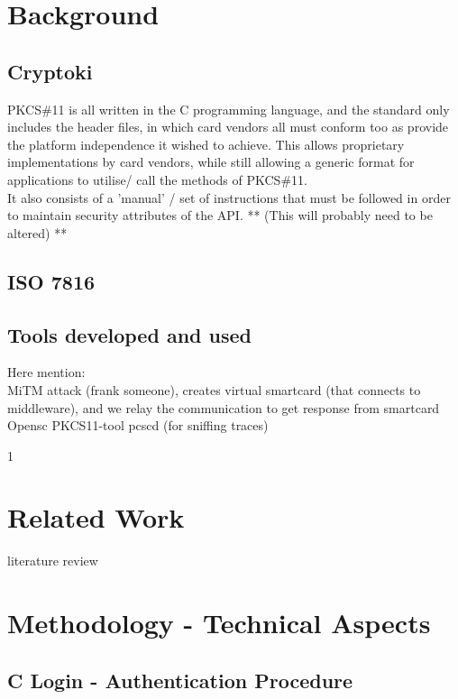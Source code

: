 \documentclass[a4paper]{report}
\begin{document}
\chapter{Background}

\section{Cryptoki}

\noindent PKCS\#11 is all written in the C programming language, and the standard only includes the header files, in which card vendors all must conform too as provide the platform independence it wished to achieve. This allows proprietary implementations by card vendors, while still allowing a generic format for applications to utilise/ call the methods of PKCS\#11.\\
It also consists of a 'manual' / set of instructions that must be followed in order to maintain security attributes of the API. ** (This will probably need to be altered) **\\


\section{ISO 7816}

\section{Tools developed and used}
Here mention:\\
MiTM attack (frank someone), creates virtual smartcard (that connects to middleware), and we relay the communication to get response from smartcard
Opensc
PKCS11-tool
pcscd (for sniffing traces)


1
\chapter{Related Work}
literature review

\chapter{Methodology - Technical Aspects}

\section{C Login - Authentication Procedure}

\end{document}
